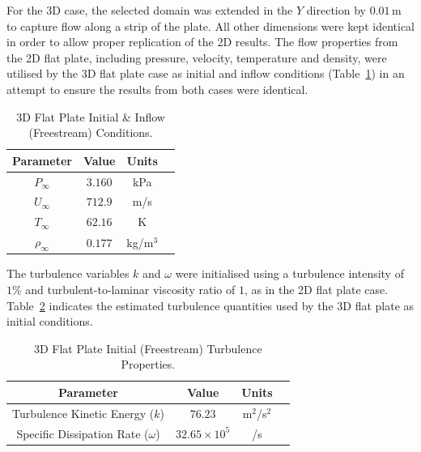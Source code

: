 For the 3D case, the selected domain was extended in the $Y$ direction by $0.01$\,m to capture flow along a strip of the plate. All other dimensions were kept identical in order to allow proper replication of the 2D results. The flow properties from the 2D flat plate, including pressure, velocity, temperature and density, were utilised by the 3D flat plate case as initial and inflow conditions (Table~\ref{t:tc1:initial}) in an attempt to ensure the results from both cases were identical.
%
\begin{table}[htbp]
  \caption{3D Flat Plate Initial \& Inflow (Freestream) Conditions.}
  \label{t:tc1:initial}
  \begin{center}
  \begin{tabular}{cccl}
  \hline\hline
     Parameter  & Value & Units \\
  \hline
    $P_\infty$  & $3.160$ & kPa  \\
    $U_\infty$  & $712.9$ & m/s  \\
    $T_\infty$  & $62.16$ & K  \\
    $\rho_\infty$  & $0.177$ & kg/m$^3$  \\
  \hline\hline
  \end{tabular}
  \end{center}
\end{table}

%
The turbulence variables $k$ and $\omega$ were initialised using a turbulence intensity of $1\%$ and turbulent-to-laminar viscosity ratio of $1$, as in the 2D flat plate case. Table~\ref{t:tc1:turb} indicates the estimated turbulence quantities used by the 3D flat plate as initial conditions.
%
\begin{table}[htbp]
  \caption{3D Flat Plate Initial (Freestream) Turbulence Properties.}
  \label{t:tc1:turb}
  \begin{center}
  \begin{tabular}{cccl}
  \hline\hline
     Parameter  & Value & Units \\
  \hline
    Turbulence Kinetic Energy ($k$)  & $76.23$ & m$^2$/s$^2$  \\
    Specific Dissipation Rate ($\omega$)  & $32.65\times10^5$ & /s  \\
  \hline\hline
  \end{tabular}
  \end{center}
\end{table}
%

